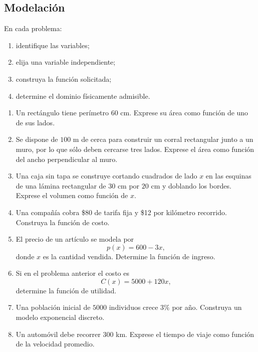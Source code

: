\documentclass[12pt]{article}
\theoremstyle{remark}
\begin{document}
\subsection{Modelación}

En cada problema:
\begin{enumerate}[label=\alph*)]
    \item identifique las variables;
    \item elija una variable independiente;
    \item construya la función solicitada;
    \item determine el dominio físicamente admisible.
\end{enumerate}

\begin{enumerate}
    \item Un rectángulo tiene perímetro $60$ cm. Exprese su área como función
    de uno de sus lados.

    \item Se dispone de $100$ m de cerca para construir un corral rectangular
    junto a un muro, por lo que sólo deben cercarse tres lados. Exprese el área
    como función del ancho perpendicular al muro.

    \item Una caja sin tapa se construye cortando cuadrados de lado $x$ en las
    esquinas de una lámina rectangular de $30$ cm por $20$ cm y doblando los
    bordes. Exprese el volumen como función de $x$.

    \item Una compañía cobra \$80 de tarifa fija y \$12 por kilómetro recorrido.
    Construya la función de costo.

    \item El precio de un artículo se modela por
    \[
    p(x)=600-3x,
    \]
    donde $x$ es la cantidad vendida. Determine la función de ingreso.

    \item Si en el problema anterior el costo es
    \[
    C(x)=5000+120x,
    \]
    determine la función de utilidad.

    \item Una población inicial de $5000$ individuos crece $3\%$ por año.
    Construya un modelo exponencial discreto.

    \item Un automóvil debe recorrer $300$ km. Exprese el tiempo de viaje como
    función de la velocidad promedio.
\end{enumerate}
\end{document}
